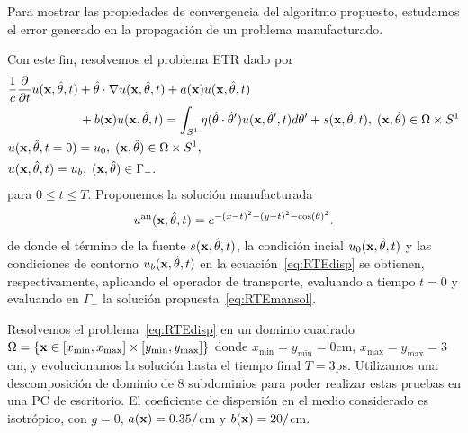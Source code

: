 Para mostrar las propiedades de convergencia del algoritmo propuesto,
estudamos el error generado en la propagación de un problema manufacturado.

Con este fin, resolvemos el problema ETR dado por 
\begin{equation*}
\begin{split}
\begin{aligned}
&\frac{1}{c}\frac{\partial }{\partial t}u(\mathbf{x},\hat{\theta},t) + \hat{\theta} \cdot \nabla u(\mathbf{x},\hat{\theta},t)+a(\mathbf{x})u(\mathbf{x},\hat{\theta},t)  \\
&\quad \quad \quad  \quad \quad \; \;\,  +b(\mathbf{x})u(\mathbf{x},\hat{\theta},t) = \int_{S^1}\eta(\hat{\theta}\cdot\hat{\theta} ') 
u(\mathbf{x},\hat \theta',t) d\theta'+s(\mathbf{x},\hat{\theta},t),  \; (\mathbf{x},\hat{\theta})  \in \Omega\times S^1\\
&u(\mathbf{x},\hat{\theta},t=0)=u_0, \; (\mathbf{x},\hat{\theta})  \in \Omega\times S^1,  \\
&u(\mathbf{x},\hat{\theta},t)=u_b, \; (\mathbf{x},\hat{\theta}) \in \Gamma_-. \notag
\end{aligned}
\end{split}
\label{eq:RTEdisp}
\end{equation*}
para $0\leq t \leq T$. Proponemos la solución manufacturada
\begin{equation*}
u^{\text{an}}(\mathbf{x},\hat{\theta},t)=e^{-(x-t)^2-(y-t)^2-\cos(\theta)^2}.
\label{eq:RTEmansol}
\end{equation*}
de donde el término de la fuente $s(\mathbf{x},\hat{\theta},t)$, 
la condición incial $u_0(\mathbf{x},\hat{\theta},t)$ y las condiciones 
de contorno $u_b(\mathbf{x},\hat{\theta},t)$ en la ecuación~\eqref{eq:RTEdisp} 
se obtienen, respectivamente, aplicando el operador de transporte, 
evaluando a tiempo $t=0$ y evaluando en $\Gamma_-$ la solución 
propuesta~\eqref{eq:RTEmansol}.


Resolvemos el problema~\eqref{eq:RTEdisp} en un dominio cuadrado 
$\Omega=\{ \mathbf{x} \in [x_{\text{min}},x_{\text{max}}]\times [y_{\text{min}},y_{\text{max}}] \}$
donde $x_{\text{min}}=y_{\text{min}}=0$cm, $x_{\text{max}}=y_{\text{max}}=3$cm, 
y evolucionamos la solución hasta el tiempo final $T=3$ps. Utilizamos 
una descomposición de dominio de 8 subdominios para 
poder realizar estas pruebas en una PC de escritorio. 
El coeficiente de dispersión en el medio considerado es isotrópico, 
con $g=0$, $a(\mathbf{x})=0.35/$cm y $b(\mathbf{x})=20/$cm. 

\pagebreak

